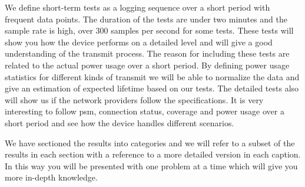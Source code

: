 \documentclass[USenglish]{ifimaster}  %
\begin{document}
We define short-term tests as a logging sequence over a short period with frequent data points. The duration of the tests are under two minutes and the sample rate is high, over 300 samples per second for some tests. These tests will show you how the device performs on a detailed level and will give a good understanding of the transmit process. The reason for including these tests are related to the actual power usage over a short period. By defining power usage statistics for different kinds of transmit we will be able to normalize the data and give an estimation of expected lifetime based on our tests. The detailed tests also will show us if the network providers follow the specifications. It is very interesting to follow \acrshort{psm}, connection status, coverage and power usage over a short period and see how the device handles different scenarios.

We have sectioned the results into categories and we will refer to a subset of the results in each section with a reference to a more detailed version in each caption. In this way you will be presented with one problem at a time which will give you more in-depth knowledge.
\end{document}
